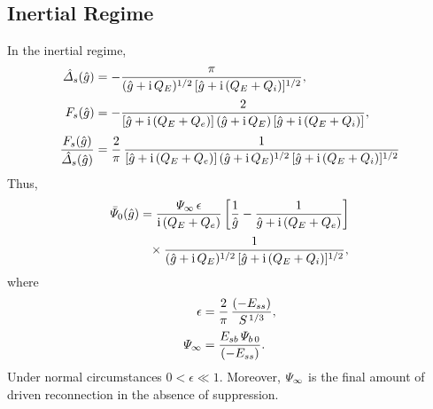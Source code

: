 \documentclass[titlepage=false,12pt]{article}
\begin{document}
\subsection{Inertial Regime}
In the inertial regime,
\begin{align}
\hat{\mit\Delta}_s(\hat{g}) &= -\frac{\pi}{(\hat{g}+{\rm i}\,Q_E)^{1/2}\,[\hat{g} + {\rm i}\,(Q_E+Q_i)]^{1/2}},\\[0.5ex]
F_s(\hat{g}) &= - \frac{2}{[\hat{g}+{\rm i}\,(Q_E+Q_e)]\,(\hat{g}+{\rm i}\,Q_E)\,[\hat{g} + {\rm i}\,(Q_E+Q_i)]},\\[0.5ex]
\frac{F_s(\hat{g})}{\hat{\mit\Delta}_s(\hat{g})}&=\frac{2}{\pi}\, \frac{1}{[\hat{g}+{\rm i}\,(Q_E+Q_e)]\,(\hat{g}+{\rm i}\,Q_E)^{1/2}\,[\hat{g} + {\rm i}\,(Q_E+Q_i)]^{1/2}}
\end{align}
Thus,
\begin{align}
\bar{\mit\Psi}_0(\hat{g}) &= \frac{{\mit\Psi}_\infty\,\epsilon}{{\rm i}\,(Q_E+Q_e)}\left[
\frac{1}{\hat{g}}- \frac{1}{\hat{g}+ {\rm i}\,(Q_E+Q_e)}\right]\nonumber\\[0.5ex]
&\phantom{=}\times
\frac{1}{(\hat{g}+{\rm i}\,Q_E)^{1/2}\,[\hat{g} + {\rm i}\,(Q_E+Q_i)]^{1/2}},
\end{align}
where 
\begin{align}
\epsilon &= \frac{2}{\pi}\,\frac{(-E_{ss})}{S^{\,1/3}},\\[0.5ex]
{\mit\Psi}_\infty &= \frac{E_{sb}\,{\mit\Psi}_{b\,0}}{(-E_{ss})}.
\end{align}
Under normal circumstances $0<\epsilon\ll 1$. Moreover, ${\mit\Psi}_\infty$ is the final amount of driven reconnection in the absence of
suppression. 
\end{document}
